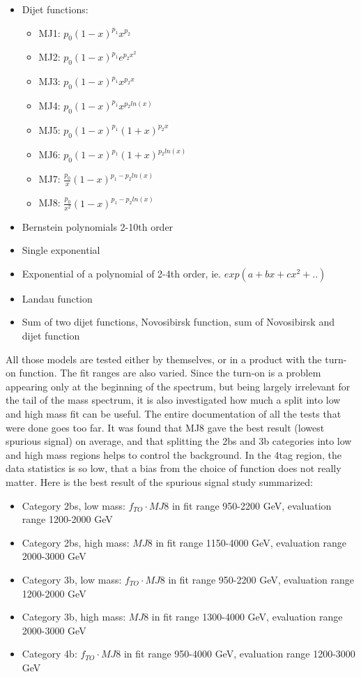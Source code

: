 \begin{itemize}
\item Dijet functions:
\begin{itemize}
\item MJ1: $p_0 (1-x)^{p_1} x^{p_2}$
\item MJ2: $p_0 (1-x)^{p_1} e^{p_2 x^2}$
\item MJ3: $p_0 (1-x)^{p_1} x^{p_2 x}$
\item MJ4: $p_0 (1-x)^{p_1} x^{p_2 ln(x)}$
\item MJ5: $p_0 (1-x)^{p_1} (1+x)^{p_2 x}$
\item MJ6: $p_0 (1-x)^{p_1} (1+x)^{p_2 ln(x)}$
\item MJ7: $\frac{p_0}{x} (1-x)^{p_1-p_2 ln(x)}$
\item MJ8: $\frac{p_0}{x^2} (1-x)^{p_1-p_2 ln(x)}$
\end{itemize}
\item Bernstein polynomials 2-10th order
\item Single exponential
\item Exponential of a polynomial of 2-4th order, ie. $exp\left(a+bx+cx^2+..\right)$
\item Landau function
\item Sum of two dijet functions, Novosibirsk function, sum of Novosibirsk and dijet function
\end{itemize}

All those models are tested either by themselves, or in a product with the turn-on function.
The fit ranges are also varied. Since the turn-on is a problem appearing only at the beginning of the spectrum, but being largely irrelevant for the tail of the mass spectrum, it is also investigated how much a split into low and high mass fit can be useful. The entire documentation of all the tests that were done goes too far. It was found that MJ8 gave the best result (lowest spurious signal) on average, and that splitting the 2bs and 3b categories into low and high mass regions helps to control the background. In the 4tag region, the data statistics is so low, that a bias from the choice of function does not really matter. Here is the best result of the spurious signal study summarized:

\begin{itemize}
\item Category 2bs, low mass: $f_{TO}\cdot MJ8$ in fit range 950-2200 GeV, evaluation range 1200-2000 GeV
\item Category 2bs, high mass: $MJ8$ in fit range 1150-4000 GeV, evaluation range 2000-3000 GeV
\item Category 3b, low mass: $f_{TO}\cdot MJ8$ in fit range 950-2200 GeV, evaluation range 1200-2000 GeV
\item Category 3b, high mass: $MJ8$ in fit range 1300-4000 GeV, evaluation range 2000-3000 GeV
\item Category 4b: $f_{TO}\cdot MJ8$ in fit range 950-4000 GeV, evaluation range 1200-3000 GeV
\end{itemize}

